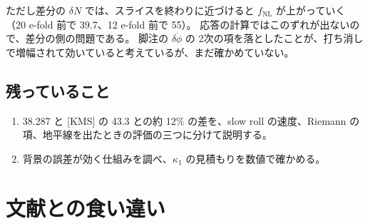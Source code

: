 \documentclass[a4paper,11pt]{ltjsarticle}
\newcommand{\fnl}{f_{\mathrm{NL}}}
\begin{document}
ただし差分の $\delta N$ では、スライスを終わりに近づけると $\fnl$ が上がっていく（20 e-fold 前で 39.7、12 e-fold 前で 55）。
応答の計算ではこのずれが出ないので、差分の側の問題である。
脚注の $\delta\dot\phi$ の 2次の項を落としたことが、打ち消しで増幅されて効いていると考えているが、まだ確かめていない。

\subsection{残っていること}

\begin{enumerate}
\item 38.287 と [KMS] の 43.3 との約 12\% の差を、slow roll の速度、Riemann の項、地平線を出たときの評価の三つに分けて説明する。
\item 背景の誤差が効く仕組みを調べ、$\kappa_1$ の見積もりを数値で確かめる。
\end{enumerate}


\section{文献との食い違い}
\label{app:discrepancies}
\end{document}
